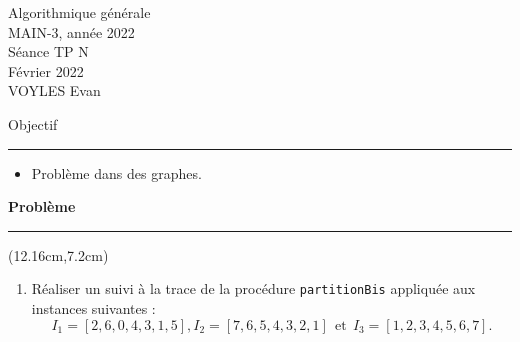 \documentclass[10pt]{article} %
\begin{document}


\vspace{-1cm}
\vspace{0.3cm}

{\raggedleft \color{mygold} Algorithmique générale\\
MAIN-3, année 2022\\
Séance TP N\\
Février 2022\\
VOYLES Evan\\}

\vspace{-0.42cm}
\vspace{1.23cm}

{\Large \noindent \color{mygold} Objectif}

{\color{mygold}\noindent\rule{\textwidth}{1pt}}
\vspace{0cm}
\begin{itemize}
    \item[{\color{mygold}\ding{43}}] Problème dans des graphes.
\end{itemize}

\vspace{1.2cm}
{\color{dullgreen}\noindent \Large \bf Problème}

\vspace{-0.28cm}
{\vspace{0cm}\color{dullgreen}\noindent\rule{\textwidth}{1pt}}

\begin{textblock*}{10cm}(12.16cm,7.2cm) %
    \Large {}
\end{textblock*}

\begin{enumerate}
    \item Réaliser un suivi à la trace de la procédure \texttt{partitionBis} appliquée aux instances suivantes :
    \begin{equation*}
        I_1 = [2,6,0,4,3,1,5], I_2 = [7,6,5,4,3,2,1]\ \ \mathrm{ et }\ \ I_3 = [1,2,3,4,5,6,7].
    \end{equation*}
\end{enumerate}

\end{document}
